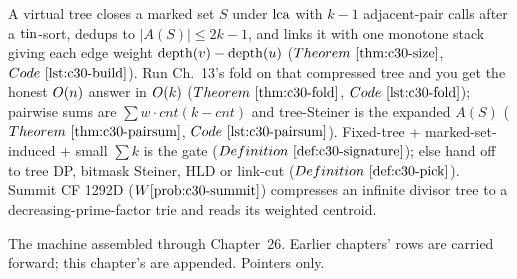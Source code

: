 \begin{recallbox}
A virtual tree closes a marked set \(S\) under \(\operatorname{lca}\) with \(k-1\) adjacent-pair calls after a
\(\operatorname{tin}\)-sort, dedups to \(|A(S)|\le2k-1\), and links it with one monotone stack giving each edge
weight \(\operatorname{depth}(v)-\operatorname{depth}(u)\) (\(\thmref{c30-size}\), \(\coderef{c30-build}\)). Run Ch.~13's fold
on that compressed tree and you get the honest \(O(n)\) answer in \(O(k)\)
(\(\thmref{c30-fold}\), \(\coderef{c30-fold}\)); pairwise sums are \(\sum w\cdot\mathit{cnt}(k-\mathit{cnt})\)
and tree-Steiner is the expanded \(A(S)\) (\(\thmref{c30-pairsum}\), \(\coderef{c30-pairsum}\)).
Fixed-tree + marked-set-induced + small \(\sum k\) is the gate (\(\defref{c30-signature}\)); else
hand off to tree DP, bitmask Steiner, HLD or link-cut (\(\defref{c30-pick}\)). Summit CF 1292D
(\(\probref{c30-summit}\)) compresses an infinite divisor tree to a decreasing-prime-factor trie and
reads its weighted centroid.
\end{recallbox}


The machine assembled through Chapter~26. Earlier chapters' rows are carried forward; this
chapter's are appended. Pointers only.

